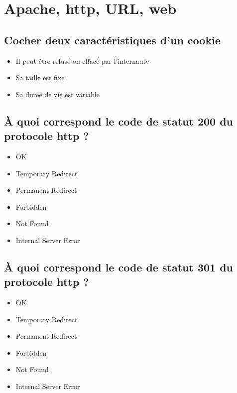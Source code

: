 \documentclass[11pt,a4paper]{article}
\begin{document}
\section{Apache, http, URL, web}


\subsection{Cocher deux caractéristiques d'un cookie}

\begin{itemize}
\item[\CaseCoche] Il peut être refusé ou effacé par l'internaute \\  %
\item[\CaseCoche] Sa taille est fixe \\
\item[\CaseCoche] Sa durée de vie est variable \\  %
\end{itemize}


\subsection{\`A quoi correspond le code de statut 200 du protocole http ?} %

\begin{itemize}
\item[\CaseCoche] OK\\  %
\item[\CaseCoche] Temporary Redirect\\
\item[\CaseCoche] Permanent Redirect\\
\item[\CaseCoche] Forbidden\\
\item[\CaseCoche] Not Found\\
\item[\CaseCoche] Internal Server Error\\
\end{itemize}


\subsection{\`A quoi correspond le code de statut 301 du protocole http ?} %

\begin{itemize}
\item[\CaseCoche] OK\\
\item[\CaseCoche] Temporary Redirect\\  %
\item[\CaseCoche] Permanent Redirect\\
\item[\CaseCoche] Forbidden\\
\item[\CaseCoche] Not Found\\
\item[\CaseCoche] Internal Server Error\\
\end{itemize}
\end{document}
